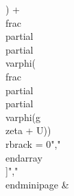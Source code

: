 {{{{{{{{{{\zeta) + \\frac{\\partial}{\\partial\\varphi}(\\frac{\\partial}{\\partial\\varphi}(g\\zeta + U))\\rbrack = 0","\\end{array}\\]","\\end{minipage} &}}}}}}}}}}
